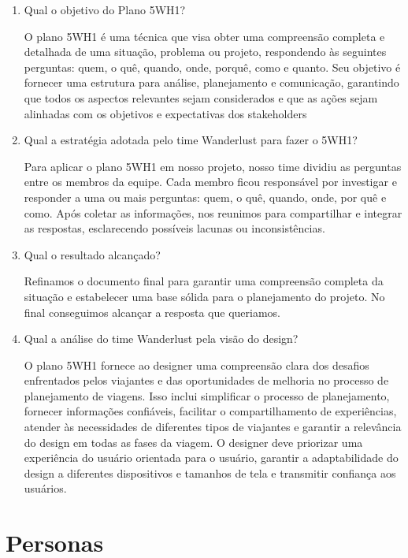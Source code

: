 \documentclass{article}
\begin{document}
\begin{enumerate}
      \item Qual o objetivo do Plano 5WH1?

            O plano 5WH1 é uma técnica que visa obter uma compreensão completa e detalhada de uma situação, problema ou projeto, respondendo às seguintes perguntas: quem, o quê, quando, onde, porquê, como e quanto. Seu objetivo é fornecer uma estrutura para análise, planejamento e comunicação, garantindo que todos os aspectos relevantes sejam considerados e que as ações sejam alinhadas com os objetivos e expectativas dos stakeholders

      \item Qual a estratégia adotada pelo time Wanderlust para fazer o 5WH1?

            Para aplicar o plano 5WH1 em nosso projeto, nosso time dividiu as perguntas entre os membros da equipe. Cada membro ficou responsável por investigar e responder a uma ou mais perguntas: quem, o quê, quando, onde, por quê e como. Após coletar as informações, nos reunimos para compartilhar e integrar as respostas, esclarecendo possíveis lacunas ou inconsistências.

      \item Qual o resultado alcançado?

            Refinamos o documento final para garantir uma compreensão completa da situação e estabelecer uma base sólida para o planejamento do projeto. No final conseguimos alcançar a resposta que queriamos.

      \item Qual a análise do time Wanderlust pela visão do design?

            O plano 5WH1 fornece ao designer uma compreensão clara dos desafios enfrentados pelos viajantes e das oportunidades de melhoria no processo de planejamento de viagens. Isso inclui simplificar o processo de planejamento, fornecer informações confiáveis, facilitar o compartilhamento de experiências, atender às necessidades de diferentes tipos de viajantes e garantir a relevância do design em todas as fases da viagem. O designer deve priorizar uma experiência do usuário orientada para o usuário, garantir a adaptabilidade do design a diferentes dispositivos e tamanhos de tela e transmitir confiança aos usuários.

\end{enumerate}

\section{Personas}
\end{document}
